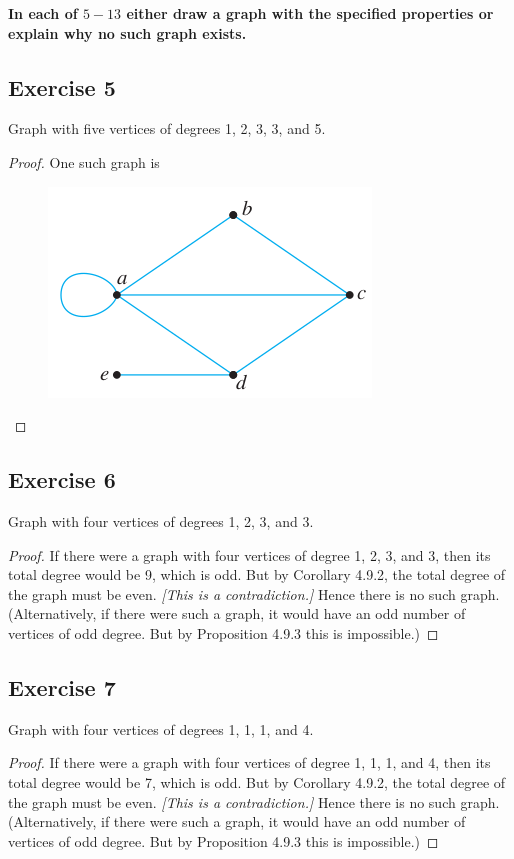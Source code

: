 \documentclass[14pt]{extarticle}
\newcommand{\cy}{\color{cyan}}
\begin{document}
{\bf \cy In each of $5-13$ either draw a graph with the specified properties or explain why no such graph exists.}

\subsection{Exercise 5}
Graph with five vertices of degrees 1, 2, 3, 3, and 5.

\begin{proof}
One such graph is
\begin{figure}[ht!]
\centering
\includegraphics[scale=0.5]{../images/4.9.5.png}
\end{figure}
\end{proof}

\subsection{Exercise 6}
Graph with four vertices of degrees 1, 2, 3, and 3.

\begin{proof}
If there were a graph with four vertices of degree 1, 2, 3, and 3, then its total degree would be 9, which is odd. But by Corollary 4.9.2, the total degree of the graph must be even. {\it [This is a contradiction.]} Hence there is no such graph. (Alternatively, if there were such a graph, it would have an odd number of vertices of odd degree. But by Proposition 4.9.3 this is impossible.)
\end{proof}

\subsection{Exercise 7}
Graph with four vertices of degrees 1, 1, 1, and 4.

\begin{proof}
If there were a graph with four vertices of degree 1, 1, 1, and 4, then its total degree would be 7, which is odd. But by Corollary 4.9.2, the total degree of the graph must be even. {\it [This is a contradiction.]} Hence there is no such graph. (Alternatively, if there were such a graph, it would have an odd number of vertices of odd degree. But by Proposition 4.9.3 this is impossible.)
\end{proof}
\end{document}
